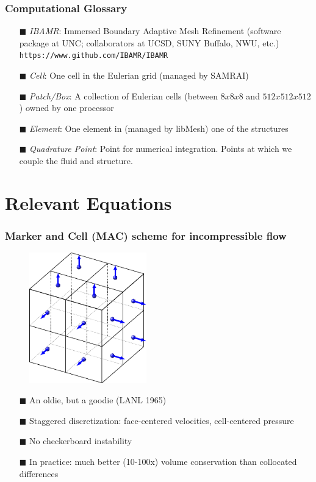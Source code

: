 \documentclass[8pt]{beamer}
\begin{document}
\begin{frame}
    \frametitle{Computational Glossary}
    \begin{itemize}
        \item[$\blacksquare$] \emph{IBAMR}: Immersed Boundary Adaptive Mesh
        Refinement (software package at UNC; collaborators at UCSD, SUNY
        Buffalo, NWU, etc.) \texttt{https://www.github.com/IBAMR/IBAMR}
        \item[$\blacksquare$] \emph{Cell}: One cell in the Eulerian grid
        (managed by SAMRAI)
        \item[$\blacksquare$] \emph{Patch/Box}: A collection of Eulerian cells
        (between \(8x8x8\) and \(512x512x512\)) owned by one processor
        \item[$\blacksquare$] \emph{Element}: One element in (managed by
        libMesh) one of the structures
        \item[$\blacksquare$] \emph{Quadrature Point}: Point for numerical
        integration. Points at which we couple the fluid and structure.
    \end{itemize}
\end{frame}

\section{Relevant Equations}
\begin{frame}
    \frametitle{Marker and Cell (MAC) scheme for incompressible flow}
    \begin{figure}
        \centering
        \includegraphics[width=2in]{face-centered.pdf}
    \end{figure}
    \begin{itemize}
        \item[$\blacksquare$] An oldie, but a goodie (LANL 1965)
        \item[$\blacksquare$] Staggered discretization: face-centered
        velocities, cell-centered pressure
        \item[$\blacksquare$] No checkerboard instability
        \item[$\blacksquare$] In practice: much better (10-100x) volume
        conservation than collocated differences
    \end{itemize}
\end{frame}
\end{document}
